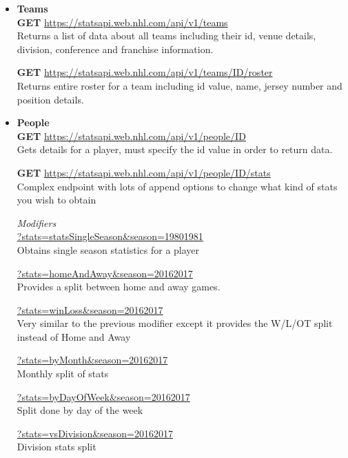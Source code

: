 \documentclass[11pt]{article}
\begin{document}
    \begin{itemize}
        \item \textbf{Teams} \\
            \textbf{GET} \url{https://statsapi.web.nhl.com/api/v1/teams} \\
            Returns a list of data about all teams including their id, venue details, division, conference and franchise information.

            \textbf{GET} \url{https://statsapi.web.nhl.com/api/v1/teams/ID/roster} \\
            Returns entire roster for a team including id value, name, jersey number and position details.

        \item \textbf{People} \\
            \textbf{GET} \url{https://statsapi.web.nhl.com/api/v1/people/ID} \\
            Gets details for a player, must specify the id value in order to return data.

            \textbf{GET} \url{https://statsapi.web.nhl.com/api/v1/people/ID/stats} \\
            Complex endpoint with lots of append options to change what kind of stats you wish to obtain

            \textit{Modifiers} \\
            \url{?stats=statsSingleSeason&season=19801981} \\
            Obtains single season statistics for a player

            \url{?stats=homeAndAway&season=20162017} \\
            Provides a split between home and away games.

            \url{?stats=winLoss&season=20162017} \\
            Very similar to the previous modifier except it provides the W/L/OT split instead of Home and Away

            \url{?stats=byMonth&season=20162017} \\
            Monthly split of stats

            \url{?stats=byDayOfWeek&season=20162017} \\
            Split done by day of the week

            \url{?stats=vsDivision&season=20162017} \\
            Division stats split


\end{itemize}
\end{document}
